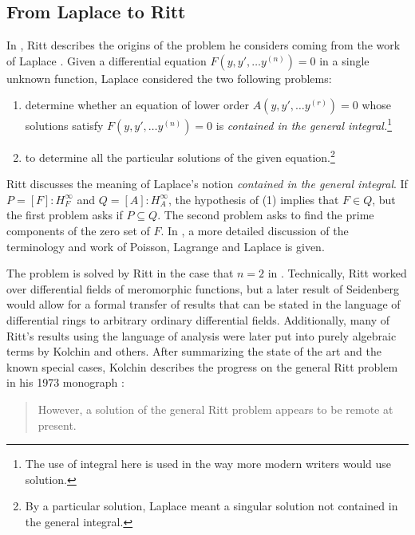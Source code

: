 \documentclass[12pt]{amsart}
\theoremstyle{definition}
\newcounter{cases}[theorem]
\numberwithin{subcase}{cases}
\theoremstyle{remark}
\begin{document}
\subsection{From Laplace to Ritt}
In \cite{ritt1936singular}, Ritt describes the origins of the problem he considers coming from the work of Laplace \cite{Laplace1775}. Given a differential equation $F(y, y' ,\ldots y^{(n)})=0$ in a single unknown function, Laplace considered the two following problems: 
\begin{enumerate}
    \item determine whether an equation of lower order $A(y, y' ,\ldots y^{(r)})=0$ whose solutions satisfy  $F(y, y' ,\ldots y^{(n)})=0$ is \emph{contained in the general integral.}\footnote{The use of integral here is used in the way more modern writers would use solution.}
    \item to determine all the particular solutions of the given equation.\footnote{By a particular solution, Laplace meant a singular solution not contained in the general integral.}
\end{enumerate}
Ritt \cite{ritt1936singular} \cite{ritt1938great} discusses the meaning of Laplace's notion \emph{contained in the general integral}. If $P=[F]:H_F^\infty$ and $Q=[A]:H_A^\infty$, the hypothesis of (1) implies that $F \in Q$, but the first problem asks if $P \subseteq Q$. The second problem asks to find the prime components of the zero set of $F$. In \cite[49-52]{ritt1938great}, a more detailed discussion of the terminology and work of Poisson, Lagrange and Laplace is given. 

The problem is solved by Ritt in the case that $n=2$ in \cite{ritt1936singular}. Technically, Ritt worked over differential fields of meromorphic functions, but a later result of Seidenberg \cite{seidenberg1958abstract} would allow for a formal transfer of results that can be stated in the language of differential rings to arbitrary ordinary differential fields. Additionally, many of Ritt's results using the language of analysis were later put into purely algebraic terms by Kolchin and others. After summarizing the state of the art and the known special cases, Kolchin describes the progress on the general Ritt problem in his 1973 monograph \cite{Kolchin73}: 

\begin{quote}
    However, a solution of the general Ritt problem appears to be remote at present. 
\end{quote}
\end{document}
